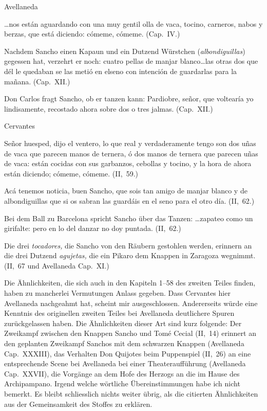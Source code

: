 \begin{multicols}{2}
\centerline{Avellaneda}

{\itquoted\spanish\dots nos están aguardando
con una muy gentil olla de vaca, tocino, carneros, nabos y berzas,
que está diciendo: cómeme, cómeme.} (Cap.~IV.)

Nachdem Sancho einen Kapaun
und ein Dutzend Würstchen ({\it\spanish albondiguillas\/})
gegessen hat, verzehrt er noch: {\itquoted\spanish cuatro pellas de
manjar blanco\dots las otras dos que dél le quedaban se las metió
en elseno con intención de guardarlas para la mañana.} (Cap.~XII.)

Don Carlos fragt Sancho, ob
er tanzen kann: {\itquoted\spanish Pardiobre, señor,
que voltearía yo lindisamente,
recostado ahora sobre dos o tres
jalmas.} (Cap.~XII.)

\columnbreak
\centerline{Cervantes}

{\itquoted\spanish Señor huesped, dijo el ventero, lo que real y verdaderamente
tengo son dos uñas de vaca que parecen manos de ternera, ó
dos manos de ternera que parecen uñas de vaca: están cocidas con
sus garbanzos, cebollas y tocino, y la hora de ahora están diciendo;
cómeme, cómeme.} (II,~59.)

{\itquoted\spanish Acá tenemos noticia, buen Sancho, que sois tan amigo de
manjar blanco y de albondiguillas que si os sabran las guardáis en el
seno para el otro día.} (II,~62.)

Bei dem Ball zu Barcelona spricht Sancho über das Tanzen:
\dots {\itquoted\spanish zapateo como un girifalte:
pero en lo del danzar no doy puntada.} (II,~62.)
\end{multicols}

Die drei {\it tocadores,} die Sancho von den Räubern gestohlen werden,
erinnern an die drei Dutzend {\it agujetas,} die ein Pikaro dem Knappen in
Zaragoza wegnimmt. (II,~67 und Avellaneda Cap.~XI.)

Die Ähnlichkeiten, die sich auch in den Kapiteln 1--58 des zweiten
Teiles finden, haben zu mancherlei Vermutungen Anlass gegeben. Dass
Cervantes hier Avellaneda nachgeahmt hat, scheint mir ausgeschlossen.
Andererseits würde eine Kenntnis des originellen zweiten Teiles bei
Avellaneda deutlichere Spuren zurückgelassen haben. Die Ähnlichkeiten
dieser Art sind kurz folgende: Der Zweikampf zwischen den Knappen
Sancho und Tomé Cecial (II,~14) erinnert an den geplanten Zweikampf
Sanchos mit dem schwarzen Knappen (Avellaneda Cap.~XXXIII), das
Verhalten Don Quijotes beim Puppenspiel (II,~26) an eine entsprechende
Scene bei Avellaneda bei einer Theateraufführung (Avellaneda Cap.~XXVII),
die Vorgänge an dem Hofe des Herzogs an die im Hause des Archipampano.
Irgend welche wörtliche Übereinstimmungen habe ich nicht
bemerkt. Es bleibt schliesslich nichts weiter übrig, als die citierten
Ähnlichkeiten aus der Gemeinsamkeit des Stoffes zu erklären.

